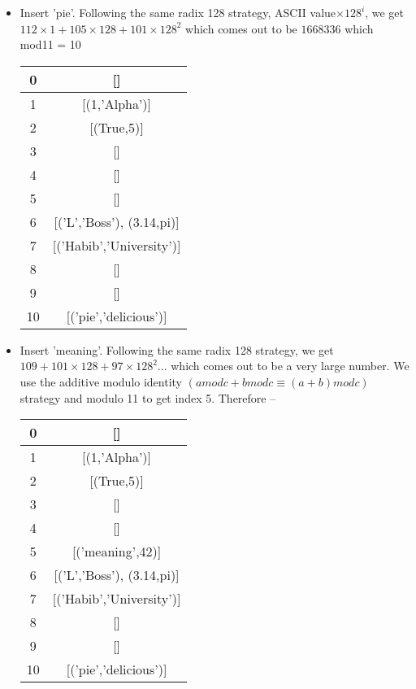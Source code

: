 \documentclass{article}
\begin{document}
\begin{enumerate}
\begin{itemize}
			\item Insert 'pie'. Following the same radix 128 strategy, ASCII value$\times 128^i$, we get $112\times 1 + 105 \times 128 + 101\times 128^2$ which comes out to be $1668336$ which mod11 = 10
					\begin{center}
						\begin{tabular}{ |c|c| } 
							\hline
							0 & []   \\ 
							\hline
							1 &	[(1,'Alpha')] \\
							\hline 
							2 & [(True,5)]  \\ 
							\hline
							3&[]\\
							\hline
							4&[]\\
							\hline
							5&[]\\
							\hline
							6&[('L','Boss'), (3.14,pi)]\\
							\hline
							7&[('Habib','University')]\\
							\hline
							8&[]\\
							\hline
							9&[]\\
							\hline
							10&[('pie','delicious')]\\
							\hline
						\end{tabular}
					\end{center}
					
			\item Insert 'meaning'. Following the same radix 128 strategy, we get $109+101\times 128 + 97\times 128^2 ...$ which comes out to be a very large number. We use the additive modulo identity $(amodc +bmodc \equiv (a+b)modc)$ strategy and modulo 11 to get index 5. Therefore --
				\begin{center}
					\begin{tabular}{ |c|c| } 
						\hline
						0 & []   \\ 
						\hline
						1 &	[(1,'Alpha')] \\
						\hline 
						2 & [(True,5)]  \\ 
						\hline
						3&[]\\
						\hline
						4&[]\\
						\hline
						5&[('meaning',42)]\\
						\hline
						6&[('L','Boss'), (3.14,pi)]\\
						\hline
						7&[('Habib','University')]\\
						\hline
						8&[]\\
						\hline
						9&[]\\
						\hline
						10&[('pie','delicious')]\\
						\hline
					\end{tabular}
				\end{center}
				

\end{itemize}
\end{enumerate}
\end{document}
